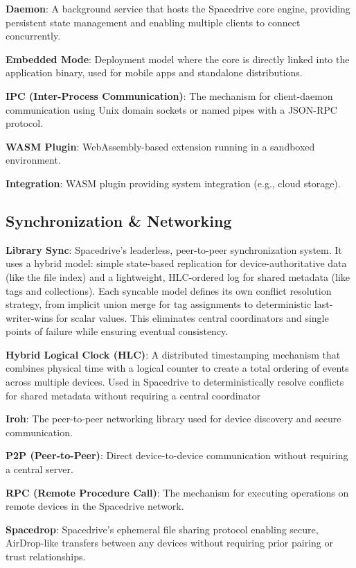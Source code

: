 \documentclass[sigconf]{acmart}
\begin{document}
\textbf{Daemon}: A background service that hosts the Spacedrive core engine, providing persistent state management and enabling multiple clients to connect concurrently.

\textbf{Embedded Mode}: Deployment model where the core is directly linked into the application binary, used for mobile apps and standalone distributions.

\textbf{IPC (Inter-Process Communication)}: The mechanism for client-daemon communication using Unix domain sockets or named pipes with a JSON-RPC protocol.

\textbf{WASM Plugin}: WebAssembly-based extension running in a sandboxed environment.

\textbf{Integration}: WASM plugin providing system integration (e.g., cloud storage).

\subsection*{Synchronization \& Networking}

\textbf{Library Sync}: Spacedrive's leaderless, peer-to-peer synchronization system. It uses a hybrid model: simple state-based replication for device-authoritative data (like the file index) and a lightweight, HLC-ordered log for shared metadata (like tags and collections). Each syncable model defines its own conflict resolution strategy, from implicit union merge for tag assignments to deterministic last-writer-wins for scalar values. This eliminates central coordinators and single points of failure while ensuring eventual consistency.

\textbf{Hybrid Logical Clock (HLC)}: A distributed timestamping mechanism that combines physical time with a logical counter to create a total ordering of events across multiple devices. Used in Spacedrive to deterministically resolve conflicts for shared metadata without requiring a central coordinator

\textbf{Iroh}: The peer-to-peer networking library used for device discovery and secure communication.

\textbf{P2P (Peer-to-Peer)}: Direct device-to-device communication without requiring a central server.

\textbf{RPC (Remote Procedure Call)}: The mechanism for executing operations on remote devices in the Spacedrive network.

\textbf{Spacedrop}: Spacedrive's ephemeral file sharing protocol enabling secure, AirDrop-like transfers between any devices without requiring prior pairing or trust relationships.
\end{document}
